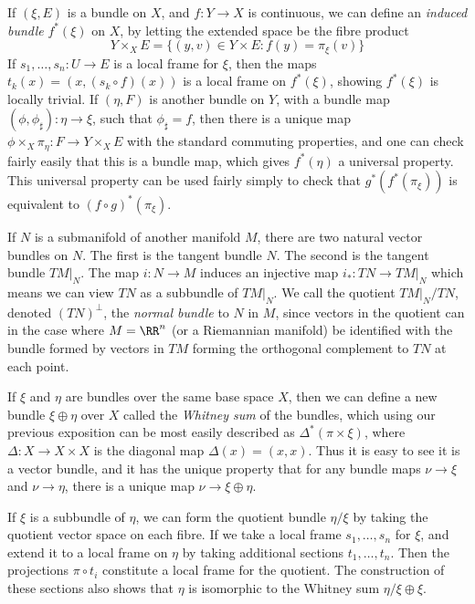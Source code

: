 \begin{example}
    If $(\xi,E)$ is a bundle on $X$, and $f: Y \to X$ is continuous, we can define an \emph{induced bundle} $f^*(\xi)$ on $X$, by letting the extended space be the fibre product
    \[ Y \times_X E = \{ (y,v) \in Y \times E: f(y) = \pi_\xi(v) \} \]
    If $s_1, \dots, s_n: U \to E$ is a local frame for $\xi$, then the maps $t_k(x) = (x,(s_k \circ f)(x))$ is a local frame on $f^*(\xi)$, showing $f^*(\xi)$ is locally trivial. If $(\eta,F)$ is another bundle on $Y$, with a bundle map $(\phi,\phi_\sharp): \eta \to \xi$, such that $\phi_\sharp = f$, then there is a unique map $\phi \times_X \pi_\eta: F \to Y \times_X E$ with the standard commuting properties, and one can check fairly easily that this is a bundle map, which gives $f^*(\eta)$ a universal property. This universal property can be used fairly simply to check that $g^*(f^*(\pi_\xi))$ is equivalent to $(f \circ g)^*(\pi_\xi)$.
\end{example}

\begin{example}
    If $N$ is a submanifold of another manifold $M$, there are two natural vector bundles on $N$. The first is the tangent bundle $N$. The second is the tangent bundle $TM|_N$. The map $i: N \to M$ induces an injective map $i_*: TN \to TM|_N$ which means we can view $TN$ as a subbundle of $TM|_N$. We call the quotient $TM|_N/TN$, denoted $(TN)^\perp$, the \emph{normal bundle} to $N$ in $M$, since vectors in the quotient can in the case where $M = \RR^n$ (or a Riemannian manifold) be identified with the bundle formed by vectors in $TM$ forming the orthogonal complement to $TN$ at each point.
\end{example}

\begin{example}
    If $\xi$ and $\eta$ are bundles over the same base space $X$, then we can define a new bundle $\xi \oplus \eta$ over $X$ called the \emph{Whitney sum} of the bundles, which using our previous exposition can be most easily described as $\Delta^*(\pi \times \xi)$, where $\Delta: X \to X \times X$ is the diagonal map $\Delta(x) = (x,x)$. Thus it is easy to see it is a vector bundle, and it has the unique property that for any bundle maps $\nu \to \xi$ and $\nu \to \eta$, there is a unique map $\nu \to \xi \oplus \eta$.
\end{example}

\begin{example}
    If $\xi$ is a subbundle of $\eta$, we can form the quotient bundle $\eta/\xi$ by taking the quotient vector space on each fibre. If we take a local frame $s_1, \dots, s_n$ for $\xi$, and extend it to a local frame on $\eta$ by taking additional sections $t_1, \dots, t_n$. Then the projections $\pi \circ t_i$ constitute a local frame for the quotient. The construction of these sections also shows that $\eta$ is isomorphic to the Whitney sum $\eta/\xi \oplus \xi$.
\end{example}

